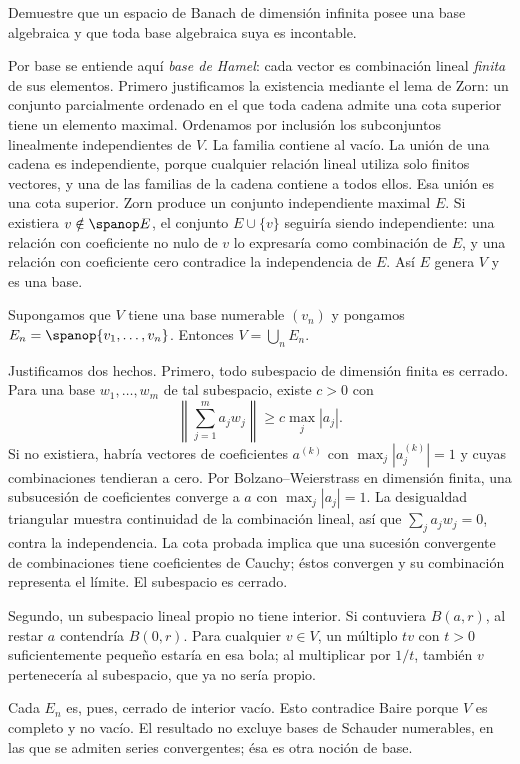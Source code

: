 \begin{ejercicio}
Demuestre que un espacio de Banach de dimensión infinita posee una base algebraica y que toda base algebraica suya es incontable.
\end{ejercicio}
\begin{solucion}
Por base se entiende aquí \emph{base de Hamel}: cada vector es combinación lineal \emph{finita} de sus elementos. Primero justificamos la existencia mediante el lema de Zorn: un conjunto parcialmente ordenado en el que toda cadena admite una cota superior tiene un elemento maximal. Ordenamos por inclusión los subconjuntos linealmente independientes de $V$. La familia contiene al vacío. La unión de una cadena es independiente, porque cualquier relación lineal utiliza solo finitos vectores, y una de las familias de la cadena contiene a todos ellos. Esa unión es una cota superior. Zorn produce un conjunto independiente maximal $E$. Si existiera $v\notin\spanop E$, el conjunto $E\cup\{v\}$ seguiría siendo independiente: una relación con coeficiente no nulo de $v$ lo expresaría como combinación de $E$, y una relación con coeficiente cero contradice la independencia de $E$. Así $E$ genera $V$ y es una base.

Supongamos que $V$ tiene una base numerable $(v_n)$ y pongamos $E_n=\spanop\{v_1,\ldots,v_n\}$. Entonces $V=\bigcup_nE_n$.

Justificamos dos hechos. Primero, todo subespacio de dimensión finita es cerrado. Para una base $w_1,\ldots,w_m$ de tal subespacio, existe $c>0$ con
\[
 \left\|\sum_{j=1}^m a_jw_j\right\|\geq c\max_j|a_j|.
\]
Si no existiera, habría vectores de coeficientes $a^{(k)}$ con $\max_j|a_j^{(k)}|=1$ y cuyas combinaciones tendieran a cero. Por Bolzano--Weierstrass en dimensión finita, una subsucesión de coeficientes converge a $a$ con $\max_j|a_j|=1$. La desigualdad triangular muestra continuidad de la combinación lineal, así que $\sum_ja_jw_j=0$, contra la independencia. La cota probada implica que una sucesión convergente de combinaciones tiene coeficientes de Cauchy; éstos convergen y su combinación representa el límite. El subespacio es cerrado.

Segundo, un subespacio lineal propio no tiene interior. Si contuviera $B(a,r)$, al restar $a$ contendría $B(0,r)$. Para cualquier $v\in V$, un múltiplo $tv$ con $t>0$ suficientemente pequeño estaría en esa bola; al multiplicar por $1/t$, también $v$ pertenecería al subespacio, que ya no sería propio.

Cada $E_n$ es, pues, cerrado de interior vacío. Esto contradice Baire porque $V$ es completo y no vacío. El resultado no excluye bases de Schauder numerables, en las que se admiten series convergentes; ésa es otra noción de base.
\end{solucion}

